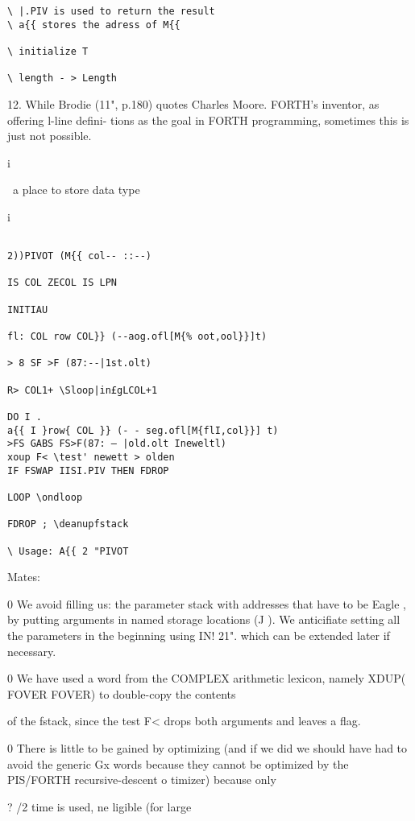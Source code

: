{{{{{{{{{{\begin{verbatim}
\ |.PIV is used to return the result
\ a{{ stores the adress of M{{

\ initialize T

\ length - > Length

\end{verbatim} 

12. While Brodie (11", p.180) quotes Charles Moore. FORTH's inventor, as offering l-line defini-
tions as the goal in FORTH programming, sometimes this is just not possible.

i

\ a place to store data type

i

 



\begin{verbatim}

2))PIVOT (M{{ col-- ::--)

IS COL ZECOL IS LPN

INITIAU

fl: COL row COL}} (--aog.ofl[M{% oot,ool}}]t)

> 8 SF >F (87:--|1st.olt)

R> COL1+ \Sloop|in£gLCOL+1

DO I .
a{{ I }row{ COL }} (- - seg.ofl[M{flI,col}}] t)
>FS GABS FS>F(87: — |old.olt Ineweltl)
xoup F< \test' newett > olden
IF FSWAP IISI.PIV THEN FDROP

LOOP \ondloop

FDROP ; \deanupfstack

\ Usage: A{{ 2 "PIVOT
\end{verbatim}

Mates:

0 We avoid filling us: the parameter stack with addresses that
have to be Eagle , by putting arguments in named storage
locations (J ). We anticifiate setting all the parameters in
the beginning using IN! 21". which can be extended later
if necessary.

0 We have used a word from the COMPLEX arithmetic lexicon,
namely XDUP( FOVER FOVER) to double-copy the contents

of the fstack, since the test F< drops both arguments and
leaves a flag.

0 There is little to be gained by optimizing (and if we did we
should have had to avoid the generic Gx words because they
cannot be optimized by the PIS/FORTH recursive-descent
o timizer) because only}? /2 time is used, ne ligible (for large

}}}}}}}}}
